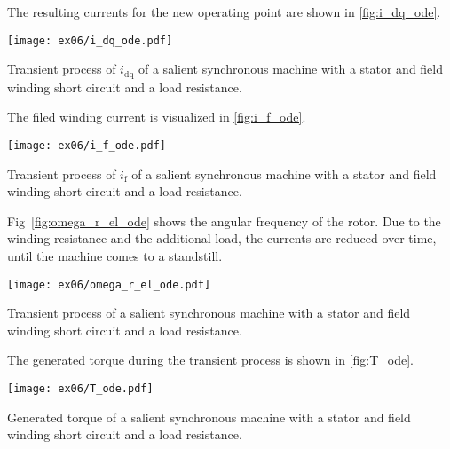 \FloatBarrier


\begin{solutionblock}
    The resulting currents for the new operating point are shown in \autoref{fig:i_dq_ode}.
    \begin{solutionfigure}[h]
        \centering
        \texttt{[image: ex06/i\_dq\_ode.pdf]}
        \caption{Transient process of $i_{\mathrm{dq}}$ of a salient synchronous machine with a stator and field winding short circuit and a load resistance.}
        \label{fig:i_dq_ode}
    \end{solutionfigure}

    The filed winding current is visualized in \autoref{fig:i_f_ode}.
    \begin{solutionfigure}[h]
        \centering
        \texttt{[image: ex06/i\_f\_ode.pdf]}
        \caption{Transient process of $i_{\mathrm{f}}$ of a salient synchronous machine with a stator and field winding short circuit and a load resistance.}
        \label{fig:i_f_ode}
    \end{solutionfigure}

    Fig~\ref{fig:omega_r_el_ode} shows the angular frequency of the rotor. Due to the winding resistance and the additional load, the currents are reduced over time, until the machine comes to a standstill.
    \begin{solutionfigure}[h]
        \centering
        \texttt{[image: ex06/omega\_r\_el\_ode.pdf]}
        \caption{Transient process of a salient synchronous machine with a stator and field winding short circuit and a load resistance.}
        \label{fig:omega_r_el_ode}
    \end{solutionfigure}

    The generated torque during the transient process is shown in \autoref{fig:T_ode}.
    \begin{solutionfigure}[h]
        \centering
        \texttt{[image: ex06/T\_ode.pdf]}
        \caption{Generated torque of a salient synchronous machine with a stator and field winding short circuit and a load resistance.}
        \label{fig:T_ode}
    \end{solutionfigure}


\end{solutionblock}

